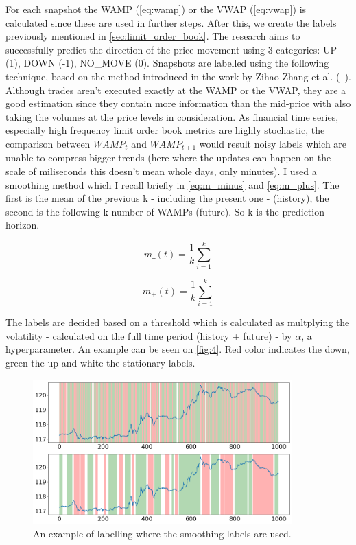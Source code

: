 \documentclass[11pt,a4paper,oneside]{article}
\begin{document}
  For each snapshot the WAMP (\ref{eq:wamp}) or the VWAP (\ref{eq:vwap}) is calculated since these are used in further 
  steps. After this, we create the labels previously mentioned in \ref{sec:limit_order_book}. The research aims to 
  successfully predict the direction of the price movement using 3 categories: UP (1), DOWN (-1), NO\_MOVE (0). 
  Snapshots are labelled using the following technique, based on the method introduced in the work by Zihao Zhang et al. 
  (~\cite{deeplob}). Although trades aren't executed exactly at the WAMP or the VWAP, they are a good estimation since 
  they contain more information than the mid-price with also taking the volumes at the price levels in consideration. 
  As financial time series, especially high frequency limit order book metrics are highly stochastic, the comparison 
  between $WAMP_t$ and $WAMP_{t+1}$ would result noisy labels which are unable to compress bigger trends (here where the
  updates can happen on the scale of miliseconds this doesn't mean whole days, only minutes). I used a smoothing method 
  which I recall briefly in \autoref{eq:m_minus} and \autoref{eq:m_plus}. The first is the mean of the previous k - 
  including the present one - (history), the second is the following k number of WAMPs (future). So k is the prediction 
  horizon.

  \begin{equation}
    m\_(t) = \frac{1}{k}\sum_{i=1}^{k}
    \label{eq:m_minus}
  \end{equation}

  \begin{equation}
    m_+(t) = \frac{1}{k}\sum_{i=1}^{k}
    \label{eq:m_plus}
  \end{equation}

  The labels are decided based on a threshold which is calculated as multplying the volatility - calculated on the full 
  time period (history + future) - by $\alpha$, a hyperparameter. An example can be seen on \autoref{fig:4}. Red color 
  indicates the down, green the up and white the stationary labels.

  \begin{figure}[tbh]
    \centering
    \includegraphics[width=10cm]{labels.png}
    \caption{An example of labelling where the smoothing labels are used.}
    \label{fig:4}
  \end{figure}
\end{document}

